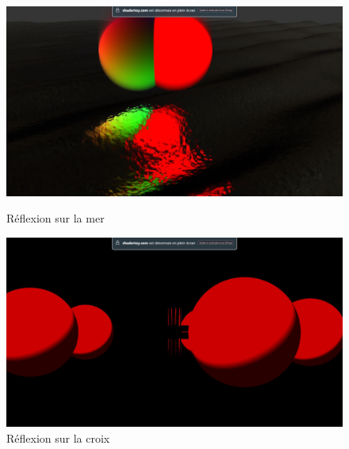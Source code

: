 \begin{figure}[h]
  \begin{minipage}[b]{0.45\linewidth}
    \centering
    \includegraphics[width=\linewidth]{images/shaders/shaderatelier_06.jpg}
    \caption{Réflexion sur la mer}
    \label{shadat06}
  \end{minipage}
  \hspace{0.1\linewidth} %
  \begin{minipage}[b]{0.45\linewidth}
    \centering
    \includegraphics[width=\linewidth]{images/shaders/shaderatelier_12.jpg}
    \caption{Réflexion sur la croix}
    \label{shadat12}
  \end{minipage}
\end{figure}

